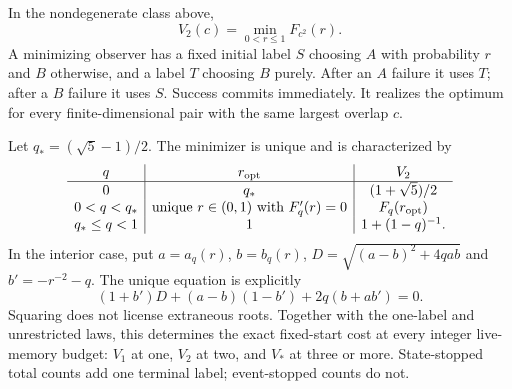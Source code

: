 \begin{theorem}\label{thm:two-label-exact}
In the nondegenerate class above,
\begin{equation}\label{eq:two-label-opt}
 V_2(c)=\min_{0<r\le1}F_{c^2}(r).
\end{equation}
A minimizing observer has a fixed initial label $S$ choosing $A$ with probability $r$ and $B$ otherwise, and a label $T$ choosing $B$ purely. After an $A$ failure it uses $T$; after a $B$ failure it uses $S$. Success commits immediately. It realizes the optimum for every finite-dimensional pair with the same largest overlap $c$.

Let $q_*=(\sqrt5-1)/2$. The minimizer is unique and is characterized by
\begin{equation}\label{eq:two-label-transition}
 \begin{array}{c|c|c}
 q&r_{\rm opt}&V_2\\\hline
 0&q_*&(1+\sqrt5)/2\\
 0<q<q_*&\text{unique }r\in(0,1)\text{ with }F'_q(r)=0&F_q(r_{\rm opt})\\
 q_*\le q<1&1&1+(1-q)^{-1}.
 \end{array}
\end{equation}
In the interior case, put $a=a_q(r)$, $b=b_q(r)$, $D=\sqrt{(a-b)^2+4qab}$ and $b'=-r^{-2}-q$. The unique equation is explicitly
\begin{equation}\label{eq:two-label-stationary}
 (1+b')D+(a-b)(1-b')+2q(b+ab')=0.
\end{equation}
Squaring does not license extraneous roots. Together with the one-label and unrestricted laws, this determines the exact fixed-start cost at every integer live-memory budget: $V_1$ at one, $V_2$ at two, and $V_*$ at three or more. State-stopped total counts add one terminal label; event-stopped counts do not.
\end{theorem}
